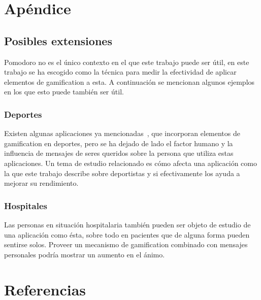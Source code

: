 \documentclass[12pt,letterpaper]{report}
\begin{document}
\newpage
\section{Apéndice}\label{sec:apendice}

\subsection{Posibles extensiones}\label{subsec:posibles-extensiones}

Pomodoro no es el único contexto en el que este trabajo puede ser
útil, en este trabajo se ha escogido como la técnica para medir la
efectividad de aplicar elementos de gamification a esta. A
continuación se mencionan algunos ejemplos en los que esto puede
también ser útil.

\subsubsection{Deportes}

Existen algunas aplicaciones ya mencionadas~\cite{zombiesrun}, que
incorporan elementos de gamification en deportes, pero se ha dejado de
lado el factor humano y la influencia de mensajes de seres queridos
sobre la persona que utiliza estas aplicaciones. Un tema de estudio
relacionado es cómo afecta una aplicación como la que este trabajo
describe sobre deportistas y si efectivamente los ayuda a mejorar su
rendimiento.

\subsubsection{Hospitales}

Las personas en situación hospitalaria también pueden ser objeto de
estudio de una aplicación como ésta, sobre todo en pacientes que de
alguna forma pueden sentirse solos. Proveer un mecanismo de
gamification combinado con mensajes personales podría mostrar un
aumento en el ánimo.

\newpage
\section{Referencias}
\printbibliography[heading=none]
\end{document}
